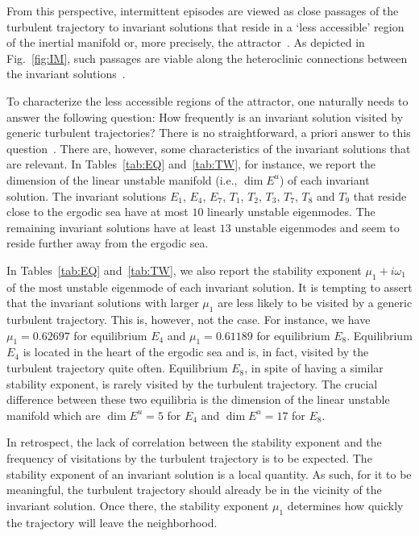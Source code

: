 \documentclass{jfm}
\begin{document}
From this perspective, intermittent episodes are viewed as close passages of the
turbulent trajectory to invariant solutions that reside in a `less accessible' region of the
inertial manifold or, more precisely, the attractor~\citep{holmes93}.
As depicted in Fig.~\ref{fig:IM}, such passages are viable along the heteroclinic connections
between the invariant solutions~\citep{holmes92,Holmes96}.

To characterize the less accessible regions of the attractor, one naturally needs to
answer the following question:
How frequently is an invariant solution visited by generic turbulent trajectories?
There is no straightforward, a priori answer to this
question~\cite[Chapter 23]{DasBuch}. There are, however,
some characteristics of the invariant solutions that are relevant. In Tables~\ref{tab:EQ}
and~\ref{tab:TW}, for instance, we report the dimension of the linear unstable manifold
(i.e., $\dim E^u$) of each invariant solution.
The invariant solutions $E_1$, $E_4$, $E_7$, $T_1$, $T_2$, $T_3$, $T_7$,
$T_8$ and $T_9$ that reside close to the ergodic sea have at most $10$
linearly unstable eigenmodes. The remaining invariant solutions have at
least $13$ unstable eigenmodes and seem to reside further away from the
ergodic sea.

In Tables~\ref{tab:EQ}
and~\ref{tab:TW}, we also report the stability exponent $\mu_1+i\omega_1$ of the most unstable
eigenmode of each invariant solution. It is tempting to assert that the
invariant solutions with larger $\mu_1$ are less likely to be visited by a generic turbulent
trajectory. This is, however, not the case. For instance, we have $\mu_1=0.62697$ for equilibrium
$E_4$ and $\mu_1=0.61189$ for equilibrium $E_8$. Equilibrium $E_4$ is located in the heart of
the ergodic sea and is, in fact, visited by the turbulent trajectory quite often. Equilibrium $E_8$,
in spite of having a similar stability exponent, is rarely visited by the turbulent trajectory.
The crucial difference between these two equilibria is the dimension of the linear unstable
manifold which are $\dim E^u=5$ for $E_4$ and $\dim E^u=17$ for $E_8$.

In retrospect, the lack of correlation between the stability exponent and the frequency
of visitations by the turbulent trajectory is to be expected. The stability exponent
of an invariant solution is a
local quantity. As such, for it to be meaningful, the turbulent trajectory should
already be in the vicinity of the invariant solution. Once there,
the stability exponent $\mu_1$ determines how quickly the trajectory will leave
the neighborhood.
\end{document}
